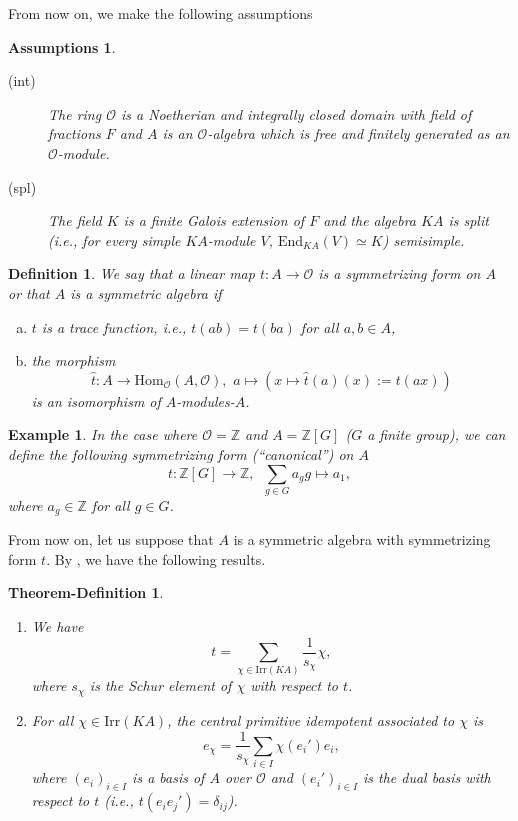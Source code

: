 \documentclass[10pt,a4paper,titlepage]{article}
\newtheorem{definition}[theorem]{Definition}
\newtheorem{ypoth}[theorem]{Assumptions}
\newtheorem{thedef}[theorem]{Theorem-Definition}
\newtheorem{px}[theorem]{Example}
\begin{document}
From now on, we make the following assumptions

\begin{ypoth}\label{properties of the ring}\
\begin{description}
  \item[(int)] The ring $\mathcal{O}$ is a Noetherian and integrally
  closed domain with field of fractions $F$ and $A$ is an
  $\mathcal{O}$-algebra which is free and finitely generated as an
  $\mathcal{O}$-module.
  \item[(spl)] The field $K$ is a finite Galois extension of $F$ and
  the algebra $KA$ is split (i.e., for every simple $KA$-module $V$, $\mathrm{End}_{KA}(V) \simeq K$) semisimple.
\end{description}
\end{ypoth}
 
\begin{definition}\label{symmetric algebra}
We say that a linear map $t:A \rightarrow \mathcal{O}$ is a
symmetrizing form on $A$ or that $A$ is a symmetric algebra if 
\begin{enumerate}[(a)]
\item $t$ is a trace function, i.e., $t(ab)=t(ba)$ for all $a,b \in
A$,
\item the
morphism
$$\hat{t}:A \rightarrow \mathrm{Hom}_\mathcal{O}(A,\mathcal{O}),\,\,
  a \mapsto (x \mapsto \hat{t}(a)(x):=t(ax))$$
is an isomorphism of $A$-modules-$A$.
\end{enumerate}
\end{definition}

\begin{px}\label{symmetrizing form of the group algebra}
\small{\emph{In the case where $\mathcal{O}=\mathbb{Z}$ and
$A=\mathbb{Z}[G]$
 ($G$ a finite group), we can define the following symmetrizing form
 (``canonical'')
 on $A$
$$t:\mathbb{Z}[G] \rightarrow \mathbb{Z}, \,\,\, \sum_{g \in G}a_g g \mapsto a_1,$$
where $a_g \in \mathbb{Z}$ for all $g \in G$.}}
\end{px}

From now on, let us suppose that $A$ is a symmetric algebra with symmetrizing form $t$. 
By \cite{Ge}, we have the following results.

\begin{thedef}\label{schur elements and idempotents}\
\begin{enumerate}
  \item We have
  $$t=\sum_{\chi \in \mathrm{Irr}(KA)}\frac{1}{s_\chi}\chi,$$
  where $s_\chi$ is the Schur element of $\chi$
  with respect to $t$. 
  \item For all $\chi \in \mathrm{Irr}(KA)$, the central primitive
  idempotent associated to $\chi$ is
  $$e_\chi=\frac{1}{s_\chi}\sum_{i \in I}
  \chi(e_i')e_i,$$
  where $(e_i)_{i \in I}$ is a basis of $A$ over
$\mathcal{O}$ and $(e_i')_{i \in I}$ is the dual basis with respect
to $t$ (i.e., $t(e_ie_j')=\delta_{ij}$).
\end{enumerate}
\end{thedef}
\end{document}
